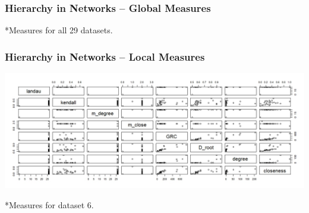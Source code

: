 \documentclass[xcolor={table}]{beamer}
\newenvironment{changemargin}[2]{%
  \begin{list}{}{%
    \setlength{\topsep}{0pt}%
    \setlength{\leftmargin}{#1}%
    \setlength{\rightmargin}{#2}%
    \setlength{\listparindent}{\parindent}%
    \setlength{\itemindent}{\parindent}%
    \setlength{\parsep}{\parskip}%
  }%
  \item[]}{\end{list}}
\begin{document}
\begin{frame}\frametitle{Hierarchy in Networks -- Global Measures}
\begin{changemargin}{-2cm}{ -2cm}
	\centering
\end{changemargin}
\tiny
*Measures for all 29 datasets.
\end{frame}

\begin{frame}\frametitle{Hierarchy in Networks -- Local Measures}
	\begin{changemargin}{-2cm}{ -2cm}
		\centering
		\includegraphics[scale = 0.3]{images/pairs_local.jpeg}
	\end{changemargin}
	\tiny
	*Measures for dataset 6.
\end{frame}
\end{document}
